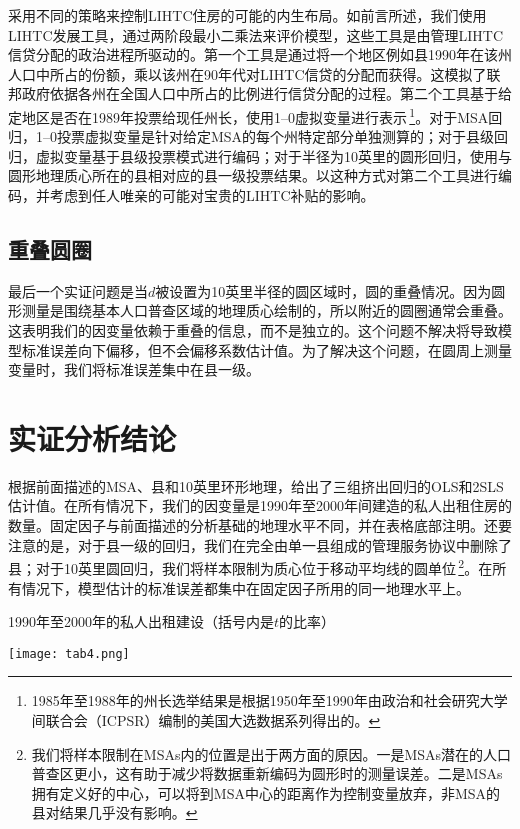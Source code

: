 \documentclass[lang=cn,11pt,a4paper]{paper}
\begin{document}
采用不同的策略来控制LIHTC住房的可能的内生布局。如前言所述，我们使用LIHTC发展工具，通过两阶段最小二乘法来评价模型，这些工具是由管理LIHTC信贷分配的政治进程所驱动的。第一个工具是通过将一个地区例如县1990年在该州人口中所占的份额，乘以该州在90年代对LIHTC信贷的分配而获得。这模拟了联邦政府依据各州在全国人口中所占的比例进行信贷分配的过程。第二个工具基于给定地区是否在1989年投票给现任州长，使用1–0虚拟变量进行表示\,\footnote{1985年至1988年的州长选举结果是根据1950年至1990年由政治和社会研究大学间联合会（ICPSR）编制的美国大选数据系列得出的。}。对于MSA回归，1–0投票虚拟变量是针对给定MSA的每个州特定部分单独测算的；对于县级回归，虚拟变量基于县级投票模式进行编码；对于半径为10英里的圆形回归，使用与圆形地理质心所在的县相对应的县一级投票结果。以这种方式对第二个工具进行编码，并考虑到任人唯亲的可能对宝贵的LIHTC补贴的影响。

\subsection{重叠圆圈}

最后一个实证问题是当$d$被设置为10英里半径的圆区域时，圆的重叠情况。因为圆形测量是围绕基本人口普查区域的地理质心绘制的，所以附近的圆圈通常会重叠。这表明我们的因变量依赖于重叠的信息，而不是独立的。这个问题不解决将导致模型标准误差向下偏移，但不会偏移系数估计值。为了解决这个问题，在圆周上测量变量时，我们将标准误差集中在县一级。

\section{实证分析结论}\label{sec5}

根据前面描述的MSA、县和10英里环形地理，给出了三组挤出回归的OLS和2SLS估计值。在所有情况下，我们的因变量是1990年至2000年间建造的私人出租住房的数量。固定因子与前面描述的分析基础的地理水平不同，并在表格底部注明。还要注意的是，对于县一级的回归，我们在完全由单一县组成的管理服务协议中删除了县；对于10英里圆回归，我们将样本限制为质心位于移动平均线的圆单位\,\footnote{我们将样本限制在MSAs内的位置是出于两方面的原因。一是MSAs潜在的人口普查区更小，这有助于减少将数据重新编码为圆形时的测量误差。二是MSAs拥有定义好的中心，可以将到MSA中心的距离作为控制变量放弃，非MSA的县对结果几乎没有影响。}。在所有情况下，模型估计的标准误差都集中在固定因子所用的同一地理水平上。

\begin{table}[h]
  \caption{1990年至2000年的私人出租建设（括号内是$t$的比率）}\label{tab4}
	\centering
	\texttt{[image: tab4.png]}
\end{table}
  
\end{document}
